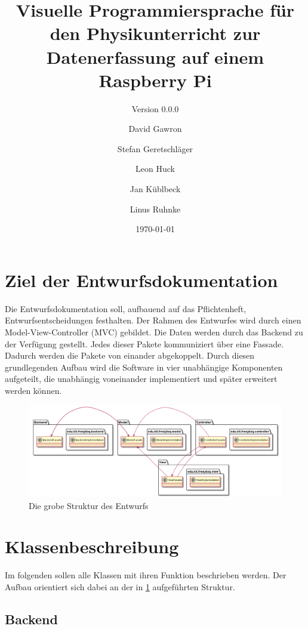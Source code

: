 \documentclass[parskip=full]{scrartcl}
\title{Visuelle Programmiersprache für den Physikunterricht zur Datenerfassung auf einem Raspberry Pi}
\subtitle{Version 0.0.0}
\author{David Gawron \and Stefan Geretschläger \and Leon Huck \and Jan Küblbeck \and Linus Ruhnke}
\date{\today}
\begin{document}
\maketitle

\clearpage
\tableofcontents 					%

\clearpage
\section{Ziel der Entwurfsdokumentation} \label{einleitung}
Die Entwurfsdokumentation soll, aufbauend auf das Pflichtenheft, Entwurfsentscheidungen festhalten. Der Rahmen des Entwurfes wird durch einen \gls{Model-View-Controller} (MVC) gebildet. Die Daten werden durch das Backend zu der Verfügung gestellt. Jedes dieser Pakete kommuniziert über eine Fassade. Dadurch werden die Pakete von einander abgekoppelt.
Durch diesen grundlegenden Aufbau wird die Software in vier unabhängige Komponenten aufgeteilt, die unabhängig voneinander implementiert und später erweitert werden können.

\begin{figure}[htbp]
	\begin{center}
		\includegraphics[width = 14cm]{Grafiken/Grober_Aufbau.png}
		\caption{Die grobe Struktur des Entwurfs}
		\label{Entwurf_Grob}
	\end{center}
\end{figure}


\clearpage
\section{Klassenbeschreibung}
Im folgenden sollen alle Klassen mit ihren Funktion beschrieben werden. Der Aufbau orientiert sich dabei an der in \ref{einleitung} aufgeführten Struktur.

\clearpage
\subsection{Backend}
\end{document}
